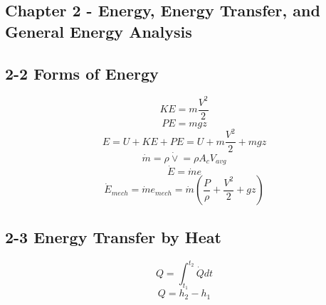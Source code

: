 \documentclass[10pt,landscape]{article}
\begin{document}
\begin{multicols}{3}
\section{Chapter 2 - Energy, Energy Transfer, and General Energy Analysis}
\subsection{2-2 Forms of Energy}
\begin{equation}
    KE=m\frac{V^2}{2}
\end{equation}
\begin{equation}
    PE=mgz
\end{equation}
\begin{equation}
    E=U+KE+PE=U+m\frac{V^2}{2}+mgz
\end{equation}
\begin{equation}
    \dot{m}=\rho\dot{\vee}=\rho A_cV_{avg}
\end{equation}
\begin{equation}
    \dot{E}=\dot{m}e
\end{equation}
\begin{equation}
    \dot{E}_{mech}=\dot{m}e_{mech}=\dot{m}(\frac{P}{\rho}+\frac{V^2}{2}+gz)
\end{equation}
\subsection{2-3 Energy Transfer by Heat}
\begin{equation}
    Q=\int^{t_2}_{t_1}\dot{Q}dt
\end{equation}
\begin{equation}
    Q=h_2-h_1
\end{equation}

\end{multicols}
\end{document}
